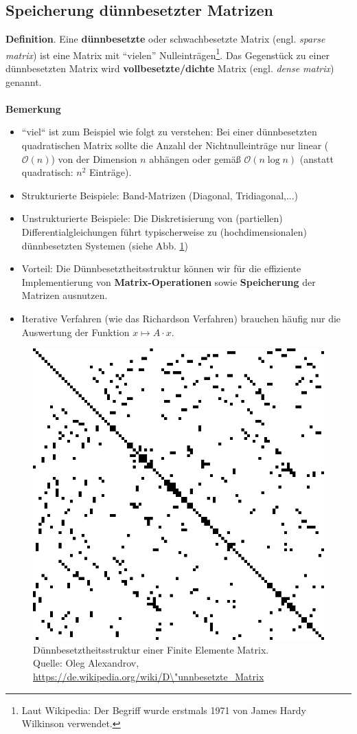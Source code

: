 \subsection{Speicherung dünnbesetzter Matrizen} \label{sec:sparseMatrix}
\textbf{Definition}.
Eine \textbf{dünnbesetzte} oder schwachbesetzte Matrix (engl. \textit{sparse matrix}) ist eine Matrix mit ``vielen'' Nulleinträgen\footnote{Laut Wikipedia: Der Begriff wurde erstmals 1971 von James Hardy Wilkinson verwendet.}. Das Gegenstück zu einer dünnbesetzten Matrix wird \textbf{vollbesetzte/dichte} Matrix (engl. \textit{dense matrix}) genannt.
~\\~\\
\textbf{Bemerkung}
\begin{itemize}
	\item ``viel`` ist zum Beispiel wie folgt zu verstehen: Bei einer dünnbesetzten quadratischen Matrix sollte die Anzahl der Nichtnulleinträge nur linear ($\mathcal{O}(n)$) von der Dimension $n$ abhängen oder gemäß $\mathcal{O}(n\log n)$ (anstatt quadratisch: $n^2$ Einträge).
	\item Strukturierte Beispiele: Band-Matrizen (Diagonal, Tridiagonal,...)
	\item Unstrukturierte Beispiele: Die Diskretisierung von (partiellen) Differentialgleichungen führt typischerweise zu (hochdimensionalen) dünnbesetzten Systemen (siehe Abb. \ref{fig:sparseFEM})
	\item Vorteil: Die Dünnbesetztheitsstruktur können wir für die effiziente Implementierung von \textbf{Matrix-Operationen} sowie \textbf{Speicherung} der Matrizen ausnutzen.
	\item Iterative Verfahren (wie das Richardson Verfahren) brauchen häufig nur die Auswertung der Funktion $x \mapsto A\cdot x$. %
\end{itemize}
\begin{figure}[h!]
	\centering
		\includegraphics[width=0.4\linewidth]{./media//sparse_matrix}
		\caption[Dünnbesetztheitsstruktur]{Dünnbesetztheitsstruktur einer Finite Elemente Matrix.\\ Quelle:  	Oleg Alexandrov, \url{https://de.wikipedia.org/wiki/D\"unnbesetzte_Matrix}}
		\label{fig:sparseFEM}
\end{figure}
